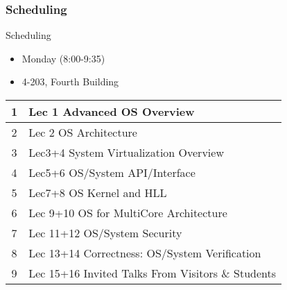 %
%
\begin{frame}[t]
	\frametitle{Scheduling}

\large
Scheduling
\begin{itemize}
	
	\item Monday (8:00-9:35)　
	\item 4-203, Fourth Building

\end{itemize}
\begin{table}[]
	\begin{tabular}{|c|l|}
		\hline
		1 & Lec 1 Advanced OS Overview                        \\ \hline
		2 & Lec 2 OS Architecture                             \\ \hline
		3 & Lec3+4  System Virtualization Overview            \\ \hline
		4 & Lec5+6  OS/System API/Interface                   \\ \hline
		5 & Lec7+8 OS Kernel and HLL                          \\ \hline
		6 & Lec 9+10 OS for MultiCore Architecture            \\ \hline
		7 & Lec 11+12 OS/System Security                      \\ \hline
		8 & Lec 13+14  Correctness: OS/System Verification    \\ \hline
		9 & Lec 15+16 Invited Talks From Visitors \& Students \\ \hline
	\end{tabular}
\end{table}

\end{frame}

